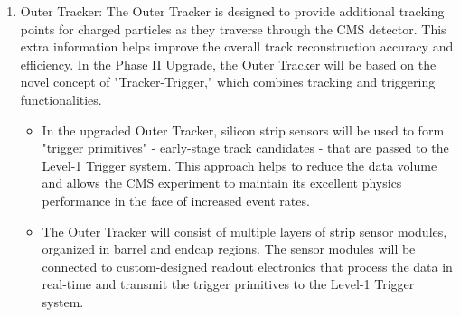\begin{enumerate}
\begin{itemize}
\end{itemize}


\item Outer Tracker: The Outer Tracker is designed to provide additional tracking points for charged particles as they traverse through the CMS detector. This extra information helps improve the overall track reconstruction accuracy and efficiency. In the Phase II Upgrade, the Outer Tracker will be based on the novel concept of "Tracker-Trigger," which combines tracking and triggering functionalities.

\begin{itemize}

\item In the upgraded Outer Tracker, silicon strip sensors will be used to form "trigger primitives" - early-stage track candidates - that are passed to the Level-1 Trigger system. This approach helps to reduce the data volume and allows the CMS experiment to maintain its excellent physics performance in the face of increased event rates.

\item The Outer Tracker will consist of multiple layers of strip sensor modules, organized in barrel and endcap regions. The sensor modules will be connected to custom-designed readout electronics that process the data in real-time and transmit the trigger primitives to the Level-1 Trigger system.

\end{itemize}




\end{enumerate}
